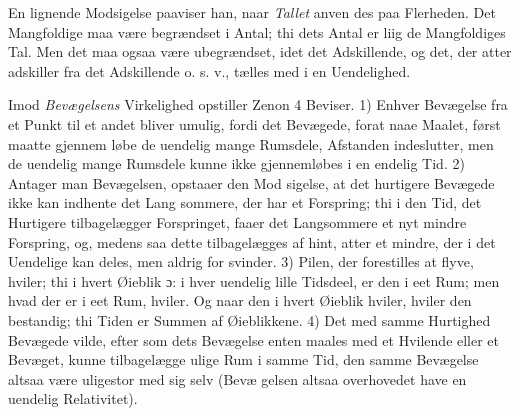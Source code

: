 \documentclass[12pt,a4paper]{book}
\begin{document}
En lignende Modsigelse paaviser han, naar \emph{Tallet} anven\-%
des paa Flerheden. Det Mangfoldige maa være begrændset i
Antal; thi dets Antal er liig de Mangfoldiges Tal. Men det
maa ogsaa være ubegrændset, idet det Adskillende, og det,
der atter adskiller fra det Adskillende o. s. v., tælles med i en
Uendelighed.

Imod \emph{Bevægelsens} Virkelighed opstiller Zenon 4 Beviser.
1) Enhver Bevægelse fra et Punkt til et andet bliver umulig,
fordi det Bevægede, forat naae Maalet, først maatte gjennem\-%
løbe de uendelig mange Rumsdele, Afstanden indeslutter, men
de uendelig mange Rumsdele kunne ikke gjennemløbes i en
endelig Tid. 2) Antager man Bevægelsen, opstaaer den Mod\-%
sigelse, at det hurtigere Bevægede ikke kan indhente det Lang\-%
sommere, der har et Forspring; thi i den Tid, det Hurtigere
tilbagelægger Forspringet, faaer det Langsommere et nyt mindre
Forspring, og, medens saa dette tilbagelægges af hint, atter
%
%
et mindre, der i det Uendelige kan deles, men aldrig for\-%
svinder. 3) Pilen, der forestilles at flyve, hviler; thi i hvert
Øieblik ɔ: i hver uendelig lille Tidsdeel, er den i eet Rum;
men hvad der er i eet Rum, hviler. Og naar den i hvert
Øieblik hviler, hviler den bestandig; thi Tiden er Summen af
Øieblikkene. 4) Det med samme Hurtighed Bevægede vilde,
efter som dets Bevægelse enten maales med et Hvilende eller
et Bevæget, kunne tilbagelægge ulige Rum i samme Tid, den
samme Bevægelse altsaa være uligestor med sig selv (Bevæ\-%
gelsen altsaa overhovedet have en uendelig Relativitet).
\end{document}
